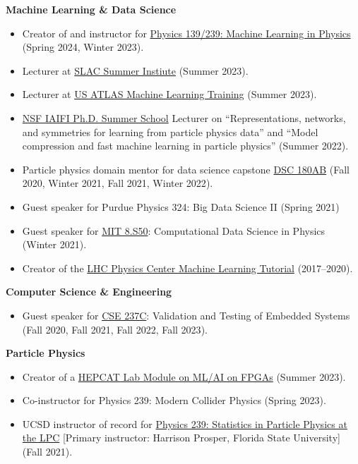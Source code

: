 \documentclass[11pt]{res}
\begin{document}
\begin{resume}
  \textbf{Machine Learning \& Data Science}
  \begin{itemize}
    \itemsep-0.3em
    \item Creator of and instructor for \href{https://jduarte.physics.ucsd.edu/phys139_239}{Physics 139/239: Machine Learning in Physics} ({Spring 2024, Winter 2023}).
    \item Lecturer at \href{https://indico.slac.stanford.edu/event/7540/}{SLAC Summer Instiute} (Summer 2023).
    \item Lecturer at \href{https://indico.cern.ch/event/1264566/}{US ATLAS Machine Learning Training} (Summer 2023).
    \item \href{https://iaifi.org/phd-summer-school.html}{NSF IAIFI Ph.D. Summer School} Lecturer on ``Representations, networks, and symmetries for learning from particle physics data'' and ``Model compression and fast machine learning in particle physics'' (Summer 2022).
    \item Particle physics domain mentor for data science capstone \href{https://jmduarte.github.io/capstone-particle-physics-domain}{DSC 180AB} ({Fall 2020, Winter 2021, Fall 2021, Winter 2022}).
    \item Guest speaker for Purdue Physics 324: Big Data Science II ({Spring 2021})
    \item Guest speaker for \href{https://github.com/violatingcp/MIT_8.S50}{MIT 8.S50}: Computational Data Science in Physics ({Winter 2021}).
    \item Creator of the \href{https://github.com/FNALLPC/machine-learning-hats}{LHC Physics Center Machine Learning Tutorial} ({2017--2020}).
  \end{itemize}

  \textbf{Computer Science \& Engineering}
  \begin{itemize}
    \itemsep-0.3em
    \item Guest speaker for \href{http://kastner.ucsd.edu/ryan/cse237c/}{CSE 237C}: Validation and Testing of Embedded Systems ({Fall 2020, Fall 2021, Fall 2022, Fall 2023}).
  \end{itemize}

  \textbf{Particle Physics}
  \begin{itemize}
    \itemsep-0.3em
    \item Creator of a \href{https://hepcat.ucsd.edu/summer-schools/fast-ml-fpga-lab/}{HEPCAT Lab Module on ML/AI on FPGAs} (Summer 2023).
    \item Co-instructor for Physics 239: Modern Collider Physics ({Spring 2023}).
    \item UCSD instructor of record for \href{https://indico.cern.ch/event/1066958/}{Physics 239: Statistics in Particle Physics at the LPC} [Primary instructor: Harrison Prosper, Florida State University] ({Fall 2021}).
  \end{itemize}


\end{resume}
\end{document}
